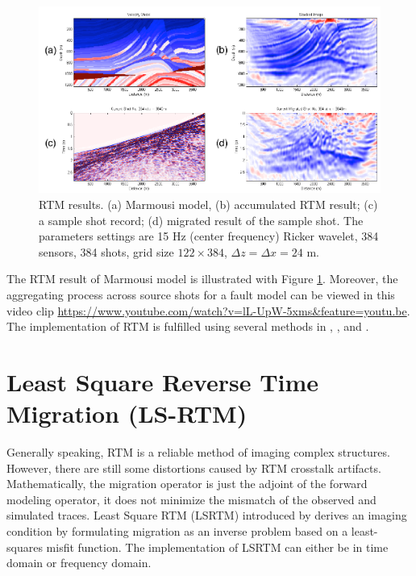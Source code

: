 \documentclass[11pt,titlepage]{article}
\theoremstyle{plain}
\theoremstyle{definition}
\theoremstyle{remark}
\numberwithin{equation}{section}
\begin{document}
\begin{figure}[htbp]
\centering
\includegraphics[width=1\textwidth]{Fig/MarmousiRTM.pdf}
\caption{RTM results. (a) Marmousi model, (b) accumulated RTM result; (c) a sample shot record; (d) migrated result of the sample shot. The parameters settings are 15 Hz (center frequency) Ricker wavelet, 384 sensors, 384 shots, grid size $122 \times 384$, $\Delta z = \Delta x = 24$ m.}
\label{fig:RTM}
\end{figure}

The RTM result of Marmousi model is illustrated with Figure \ref{fig:RTM}. Moreover, the aggregating process across source shots for a fault model can be viewed in this video clip
\url{https://www.youtube.com/watch?v=lL-UpW-5xms&feature=youtu.be}. The implementation of RTM is fulfilled using several methods in , , and .



\section{Least Square Reverse Time Migration (LS-RTM)}
Generally speaking, RTM is a reliable method of imaging complex structures. However, there are still some distortions caused by RTM crosstalk artifacts. Mathematically, the migration operator is just the adjoint of the forward modeling operator, it does not minimize the mismatch of the observed and simulated traces. Least Square RTM (LSRTM) introduced by \cite{Nemeth:1999aa} derives an imaging condition by formulating migration as an inverse problem based on a least-squares misfit function. The implementation of LSRTM can either be in time domain or frequency domain\cite{Ren:2013aa}.
\end{document}
